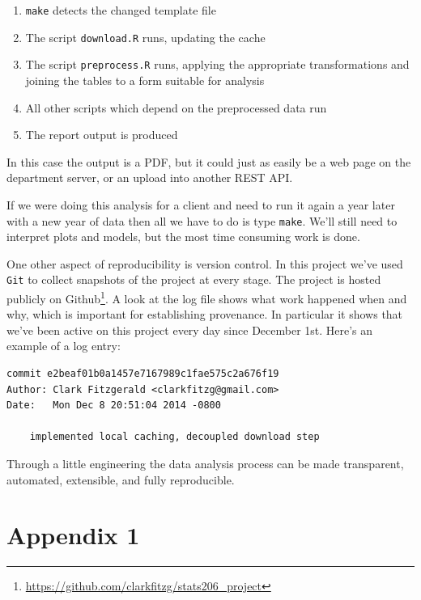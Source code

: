 \documentclass[12pt]{article}
\begin{document}
\begin{enumerate}
    \item \texttt{make} detects the changed template file
    \item The script \texttt{download.R} runs, updating the cache
    \item The script \texttt{preprocess.R} runs, applying the appropriate
        transformations and joining the tables to a form suitable for
        analysis
    \item All other scripts which depend on the preprocessed data run
    \item The report output is produced
\end{enumerate}

In this case the output is a PDF, but it could just as easily be a web page
on the department server, or an upload into another REST API.

If we were doing this analysis for a client and need to run it again a year
later with a new year of data 
then all we have to do is type \texttt{make}. We'll still need to interpret
plots and models, but the most time consuming work is done.

One other aspect of reproducibility is version control. In this
project we've used \texttt{Git} to collect snapshots of the project at
every stage. The project is hosted publicly on
Github\footnote{\url{https://github.com/clarkfitzg/stats206\_project}}.
A look at the log file shows what work happened when and why,
which is important for establishing provenance. In particular it shows 
that we've been active on this project every day since
December 1st. Here's an example of a log entry:

\begin{verbatim}
commit e2beaf01b0a1457e7167989c1fae575c2a676f19
Author: Clark Fitzgerald <clarkfitzg@gmail.com>
Date:   Mon Dec 8 20:51:04 2014 -0800

    implemented local caching, decoupled download step
\end{verbatim}

Through a little engineering the data analysis process
can be made transparent, automated, extensible, and fully reproducible.

\section{Appendix 1}


\listoffigures
\end{document}

